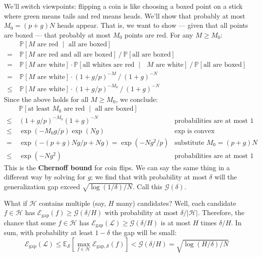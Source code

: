\documentclass{article}
\newcommand{\EE}{\mathbb{E}}
\newcommand{\PP}{\mathbb{P}}
\newcommand{\Ee}{\mathcal{E}}
\newcommand{\Gg}{\mathcal{G}}
\newcommand{\Hh}{\mathcal{H}}
\newcommand{\Ll}{\mathcal{L}}
\newcommand{\Ss}{\mathcal{S}}
\begin{document}
            We'll switch viewpoints: flipping a coin is like choosing a boxed
            point on a stick where green means tails and red means heads.
            We'll show that probably at most $M_0 = (p+g)N$ heads
            appear.  That is, we want to show --- given that all points are
            boxed --- that probably at most $M_0$ points are red. 
            For any $M\geq M_0$:
            \begin{align*}
                    & ~ \PP[\text{$M$ are red $\mid$ all are boxed}] \\
                  = & ~ \PP[\text{$M$ are red and all are boxed}] ~/~ 
                        \PP[\text{all are boxed}]  \\
                  = & ~ \PP[\text{$M$ are white}] \cdot
                        \PP[\text{all whites are red $\mid$ $M$ are white}] ~/~
                        \PP[\text{all are boxed}] \\
                  = & ~ \PP[\text{$M$ are white}] \cdot (1+g/p)^{-M} ~/~ (1+g)^{-N}  \\
                \leq& ~ \PP[\text{$M$ are white}] \cdot (1+g/p)^{-M_0} ~/~ (1+g)^{-N} 
            \end{align*}
            Since the above holds for all $M\geq M_0$, we conclude:
            \begin{align*}
                ~   & ~ \PP[\text{at least $M_0$ are red $\mid$ all are boxed}] & \\
                \leq& ~ (1+g/p)^{-M_0} (1+g)^{-N}               & \text{probabilities are at most $1$} \\
                \leq& ~ \exp(-M_0 g/p) \exp(Ng)                 & \text{$\exp$ is convex} \\ 
                =   & ~ \exp(-(p+g)N g/p + Ng) = \exp(-Ng^2/p)  & \text{substitute $M_0=(p+g)N$} \\ 
                \leq& ~ \exp(-Ng^2)                             & \text{probabilities are at most $1$}
            \end{align*}
            This is the \textbf{Chernoff bound} for coin flips.  We can say the
            same thing in a different way by solving for $g$; we find that with
            probability at most $\delta$ will the generalization gap exceed
            $\sqrt{\log(1/\delta)/N}$.  Call this $\Gg(\delta)$.

            What if $\Hh$ contains multiple (say, $H$ many) candidates?
            Well, each candidate $f\in \Hh$ has
            $
                \Ee_{\text{gap}}(f) \geq \Gg(\delta/H)
            $
            with probability at most $\delta/|\Hh|$.  Therefore, the chance
            that some $f\in \Hh$ has
            $
                \Ee_{\text{gap}}(\Ll) \geq \Gg(\delta/H)
            $
            is at most $H$ times $\delta/H$.  In sum,
            with probability at least $1-\delta$ the gap will be small:
            $$
                \Ee_{\text{gap}}(\Ll)
                    \leq \EE_{\Ss}\left[\max_{f\in\Hh} \Ee_{\text{gap}, \Ss}(f)\right]
                    < \Gg(\delta/H)
                    = \sqrt{\log(H/\delta)/N}
            $$
\end{document}
